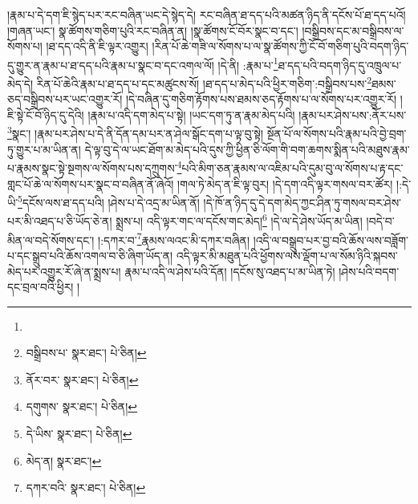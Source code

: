 །རྣམ་པ་དེ་དག་ཇི་སྙེད་པར་རང་བཞིན་ཡང་དེ་སྙེད་དེ། རང་བཞིན་ཐ་དད་པའི་མཚན་ཉིད་ནི་དངོས་པོ་ཐ་དད་པའོ། །གཞན་ཡང་། སྣ་ཚོགས་གཅིག་པུའི་རང་བཞིན་ན། །སྣ་ཚོགས་ངོ་བོར་སྣང་བ་དང་། །བསྒྲིབས་དང་མ་བསྒྲིབས་ལ་སོགས་པ། །ཐ་དད་འདི་ནི་ཇི་ལྟར་འགྱུར། །རིན་པོ་ཆེ་གཟི་ལ་སོགས་པ་ལ་སྣ་ཚོགས་ཀྱི་ངོ་བོ་གཅིག་པུའི་བདག་ཉིད་དུ་གྱུར་ན་རྣམ་པ་ཐ་དད་པའི་རྣམ་པ་སྣང་བ་དང་འགལ་ལོ། །དེ་ནི། :རྣམ་པ་\footnote{}ཐ་དད་པའི་བདག་ཉིད་དུ་འཁྲུལ་པ་མེད་དེ། རིན་པོ་ཆེའི་རྣམ་པ་ཐ་དད་པ་དང་མཚུངས་སོ། །ཐ་དད་པ་མེད་པའི་ཕྱིར་གཅིག་:བསྒྲིབས་པས་\footnote{བསྒྲིབས་པ་  སྣར་ཐང་།  པེ་ཅིན། }ཐམས་ཅད་བསྒྲིབས་པར་ཡང་འགྱུར་རོ། །དེ་བཞིན་དུ་གཅིག་རྟོགས་པས་ཐམས་ཅད་རྟོགས་པ་ལ་སོགས་པར་འགྱུར་རོ། །ཇི་སྟེ་ངོ་བོ་ཉིད་དུ་དེའི། །རྣམ་པ་འདི་དག་མེད་པ་སྟེ། །ཡང་དག་ཏུ་ན་རྣམ་མེད་པའི། །རྣམ་པར་ཤེས་པས་:ནོར་པས་\footnote{ནོར་བར་  སྣར་ཐང་།  པེ་ཅིན། }སྣང་། །རྣམ་པར་ཤེས་པ་དེ་ནི་དོན་དམ་པར་ན་ཤེལ་སྒོང་དག་པ་ལྟ་བུ་སྟེ། སྔོན་པོ་ལ་སོགས་པའི་རྣམ་པའི་བྱེ་བྲག་ཏུ་གྱུར་པ་མ་ཡིན་ན། དེ་ལྟ་བུ་དེ་ལ་ཡང་ཐོག་མ་མེད་པའི་དུས་ཀྱི་ཕྱིན་ཅི་ལོག་གི་བག་ཆགས་སྨིན་པའི་མཐུས་རྣམ་པ་རྣམས་སྣང་སྟེ་སྔགས་ལ་སོགས་པས་དཀྲུགས་\footnote{དགུགས་  སྣར་ཐང་།  པེ་ཅིན། }པའི་མིག་ཅན་རྣམས་ལ་འཇིམ་པའི་དུམ་བུ་ལ་སོགས་པ་རྟ་དང་གླང་པོ་ཆེ་ལ་སོགས་པར་སྣང་བ་བཞིན་ནོ་ཞེའོ། །གལ་ཏེ་མེད་ན་ཇི་ལྟ་བུར། །དེ་དག་འདི་ལྟར་གསལ་བར་ཚོར། །:དེ་ཡི་\footnote{དེ་ཡིས་  སྣར་ཐང་།  པེ་ཅིན། }དངོས་ལས་ཐ་དད་པའི། །ཤེས་པ་དེ་འདྲ་མ་ཡིན་ནོ། །དེ་ཁོ་ན་ཉིད་དུ་དེ་དག་མེད་ཀྱང་ཤིན་ཏུ་གསལ་བར་ཤེས་པར་མི་འཐད་པ་ཅི་ཡོད་ཅེ་ན། སྨྲས་པ། འདི་ལྟར་གང་ལ་དངོས་གང་མེད།\footnote{མེད་ན།  སྣར་ཐང་། } །དེ་ལ་དེ་ཤེས་ཡོད་མ་ཡིན། །བདེ་བ་མིན་ལ་བདེ་སོགས་དང་། །:དཀར་བ་\footnote{དཀར་བའི་  སྣར་ཐང་།  པེ་ཅིན། }རྣམས་ལའང་མི་དཀར་བཞིན། །འདི་ལ་བསྒྲུབ་པར་བྱ་བའི་ཆོས་ལས་བཟློག་པ་དང་སྒྲུབ་པའི་ཆོས་འགལ་བ་ཅི་ཞིག་ཡོད་ན། འདི་ལྟར་མི་མཐུན་པའི་ཕྱོགས་ལས་ལྡོག་པ་ལ་སོམ་ཉིའི་སྐབས་མེད་པར་འགྱུར་རོ་ཞེ་ན་སྨྲས་པ། རྣམ་པ་འདི་ལ་ཤེས་པའི་དོན། །དངོས་སུ་འཐད་པ་མ་ཡིན་ཏེ། །ཤེས་པའི་བདག་དང་བྲལ་བའི་ཕྱིར། །

